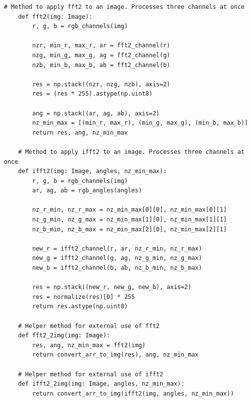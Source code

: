 \documentclass[a4paper, 12pt]{article}
\begin{document}
\begin{lstlisting}[label=task1, caption={Программные методы, необходимые для задания 1}]
    # Method to apply fft2 to an image. Processes three channels at once
    def fft2(img: Image):
        r, g, b = rgb_channels(img)
    
        nzr, min_r, max_r, ar = fft2_channel(r)
        nzg, min_g, max_g, ag = fft2_channel(g)
        nzb, min_b, max_b, ab = fft2_channel(b)
    
        res = np.stack((nzr, nzg, nzb), axis=2)
        res = (res * 255).astype(np.uint8)
    
        ang = np.stack((ar, ag, ab), axis=2)
        nz_min_max = [(min_r, max_r), (min_g, max_g), (min_b, max_b)]
        return res, ang, nz_min_max
    
    # Method to apply ifft2 to an image. Processes three channels at once
    def ifft2(img: Image, angles, nz_min_max):
        r, g, b = rgb_channels(img)
        ar, ag, ab = rgb_angles(angles)
    
        nz_r_min, nz_r_max = nz_min_max[0][0], nz_min_max[0][1]
        nz_g_min, nz_g_max = nz_min_max[1][0], nz_min_max[1][1]
        nz_b_min, nz_b_max = nz_min_max[2][0], nz_min_max[2][1]
    
        new_r = ifft2_channel(r, ar, nz_r_min, nz_r_max)
        new_g = ifft2_channel(g, ag, nz_g_min, nz_g_max)
        new_b = ifft2_channel(b, ab, nz_b_min, nz_b_max)
    
        res = np.stack((new_r, new_g, new_b), axis=2)
        res = normalize(res)[0] * 255
        return res.astype(np.uint8)

    # Helper method for external use of fft2
    def fft2_2img(img: Image):
        res, ang, nz_min_max = fft2(img)
        return convert_arr_to_img(res), ang, nz_min_max
    
    # Helper method for external use of ifft2
    def ifft2_2img(img: Image, angles, nz_min_max):
        return convert_arr_to_img(ifft2(img, angles, nz_min_max))
    \end{lstlisting}
\end{document}
